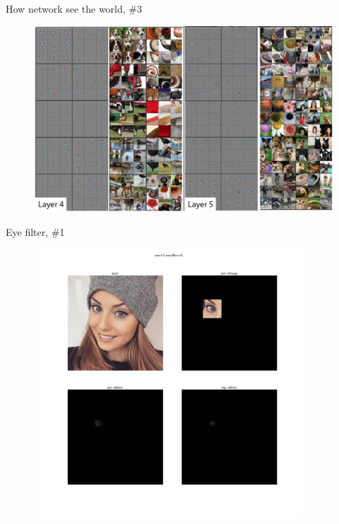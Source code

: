 \documentclass{beamer}
\begin{document}
\begin{frame}{How network see the world, \#3}

\begin{figure}[h!]
  \centering
  \includegraphics[width=1\textwidth]{images/features3.png}
\end{figure}

\end{frame}


\begin{frame}{Eye filter, \#1}

\begin{figure}[h!]
  \centering
  \includegraphics[width=0.9\textwidth]{images/eye1.png}
\end{figure}

\end{frame}
\end{document}
